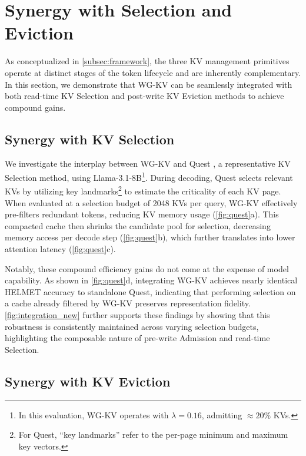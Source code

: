 \section{Synergy with Selection and Eviction}
\label{app:synergy}

As conceptualized in \cref{subsec:framework}, the three KV management primitives operate at distinct stages of the token lifecycle and are inherently complementary. In this section, we demonstrate that WG-KV can be seamlessly integrated with both read-time KV Selection and post-write KV Eviction methods to achieve compound gains.

\subsection{Synergy with KV Selection} 

We investigate the interplay between WG-KV and Quest \cite{quest}, a representative KV Selection method, using Llama-3.1-8B\footnote{In this evaluation, WG-KV operates with $\lambda = 0.16$, admitting $\approx20\%$ KVs.}. During decoding, Quest selects relevant KVs by utilizing key landmarks\footnote{For Quest, ``key landmarks'' refer to the per-page minimum and maximum key vectors.} to estimate the criticality of each KV page. When evaluated at a selection budget of 2048 KVs per query, WG-KV effectively pre-filters redundant tokens, reducing KV memory usage (\cref{fig:quest}a). This compacted cache then shrinks the candidate pool for selection, decreasing memory access per decode step (\cref{fig:quest}b), which further translates into lower attention latency (\cref{fig:quest}c).

Notably, these compound efficiency gains do not come at the expense of model capability. As shown in \cref{fig:quest}d, integrating WG-KV achieves nearly identical HELMET accuracy to standalone Quest, indicating that performing selection on a cache already filtered by WG-KV preserves representation fidelity. \cref{fig:integration_new} further supports these findings by showing that this robustness is consistently maintained across varying selection budgets, highlighting the composable nature of pre-write Admission and read-time Selection.



\subsection{Synergy with KV Eviction} 
\label{subsec:evict_synergy}

